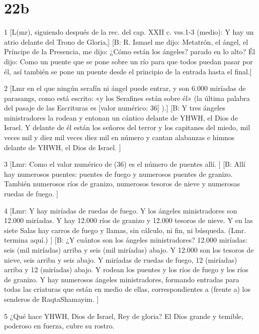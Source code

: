\chapter{22b}

\par 1 [L(mr), siguiendo después de la rec. del cap. XXII c. vss.1-3 (medio): Y hay un atrio delante del Trono de Gloria,] [B: R. Ismael me dijo: Metatrón, el ángel, el Príncipe de la Presencia, me dijo: ¿Cómo están los ángeles? parado en lo alto? Él dijo: Como un puente que se pone sobre un río para que todos puedan pasar por él, así también se pone un puente desde el principio de la entrada hasta el final.]

\par 2 [Lmr en el que ningún serafín ni ángel puede entrar, y son 6.000 miríadas de parasangs, como está escrito: «y los Serafines están sobre él» (la última palabra del pasaje de las Escrituras es [valor numérico: 36] ).] [B: Y tres ángeles ministradores la rodean y entonan un cántico delante de YHWH, el Dios de Israel. Y delante de él están los señores del terror y los capitanes del miedo, mil veces mil y diez mil veces diez mil en número y cantan alabanzas e himnos delante de YHWH, el Dios de Israel. ]

\par 3 [Lmr: Como el valor numérico de (36) es el número de puentes allí. ] [B: Allí hay numerosos puentes: puentes de fuego y numerosos puentes de granizo. También numerosos ríos de granizo, numerosos tesoros de nieve y numerosas ruedas de fuego. ]

\par 4 [Lmr: Y hay miríadas de ruedas de fuego. Y los ángeles ministradores son 12.000 miríadas. Y hay 12.000 ríos de granizo y 12.000 tesoros de nieve. Y en las siete Salas hay carros de fuego y llamas, sin cálculo, ni fin, ni búsqueda. (Lmr. termina aquí.) ] [B: ¿Y cuántos son los ángeles ministradores? 12.000 miríadas: seis (mil miríadas) arriba y seis (mil miríadas) abajo. Y 12.000 son los tesoros de nieve, seis arriba y seis abajo. Y miríadas de ruedas de fuego, 12 (miríadas) arriba y 12 (miríadas) abajo. Y rodean los puentes y los ríos de fuego y los ríos de granizo. Y hay numerosos ángeles ministradores, formando entradas para todas las criaturas que están en medio de ellas, correspondientes a (frente a) los senderos de RaqtaShamayim. ]

\par 5 ¿Qué hace YHWH, Dios de Israel, Rey de gloria? El Dios grande y temible, poderoso en fuerza, cubre su rostro.

